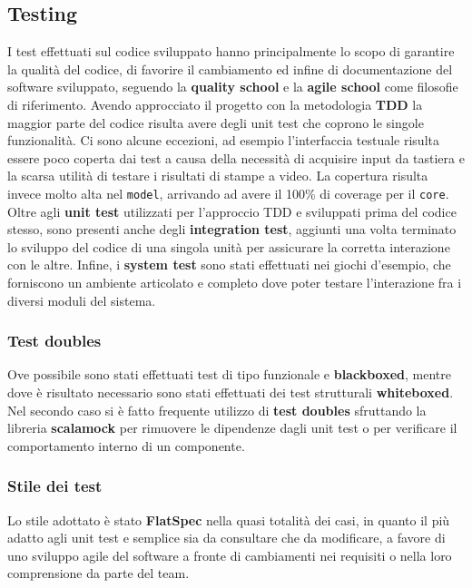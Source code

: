 \subsection{Testing}
I test effettuati sul codice sviluppato hanno principalmente lo scopo di garantire la qualità del codice, di favorire il cambiamento ed infine di documentazione del software sviluppato, seguendo la \textbf{quality school} e la \textbf{agile school} come filosofie di riferimento.
%
Avendo approcciato il progetto con la metodologia \textbf{TDD} la maggior parte del codice risulta avere degli unit test che coprono le singole funzionalità.
%
Ci sono alcune eccezioni, ad esempio l'interfaccia testuale risulta essere poco coperta dai test a causa della necessità di acquisire input da tastiera e la scarsa utilità di testare i risultati di stampe a video.
%
La copertura risulta invece molto alta nel \texttt{model}, arrivando ad avere il 100\% di coverage per il \texttt{core}.
%
Oltre agli \textbf{unit test} utilizzati per l'approccio TDD e sviluppati prima del codice stesso, sono presenti anche degli \textbf{integration test}, aggiunti una volta terminato lo sviluppo del codice di una singola unità per assicurare la corretta interazione con le altre.
%
Infine, i \textbf{system test} sono stati effettuati nei giochi d'esempio, che forniscono un ambiente articolato e completo dove poter testare l'interazione fra i diversi moduli del sistema.

\subsubsection{Test doubles}
Ove possibile sono stati effettuati test di tipo funzionale e \textbf{blackboxed}, mentre dove è risultato necessario sono stati effettuati dei test strutturali \textbf{whiteboxed}.
%
Nel secondo caso si è fatto frequente utilizzo di \textbf{test doubles} sfruttando la libreria \textbf{scalamock} per rimuovere le dipendenze dagli unit test o per verificare il comportamento interno di un componente.

\subsubsection{Stile dei test}
Lo stile adottato è stato \textbf{FlatSpec} nella quasi totalità dei casi, in quanto il più adatto agli unit test e semplice sia da consultare che da modificare, a favore di uno sviluppo agile del software a fronte di cambiamenti nei requisiti o nella loro comprensione da parte del team.

